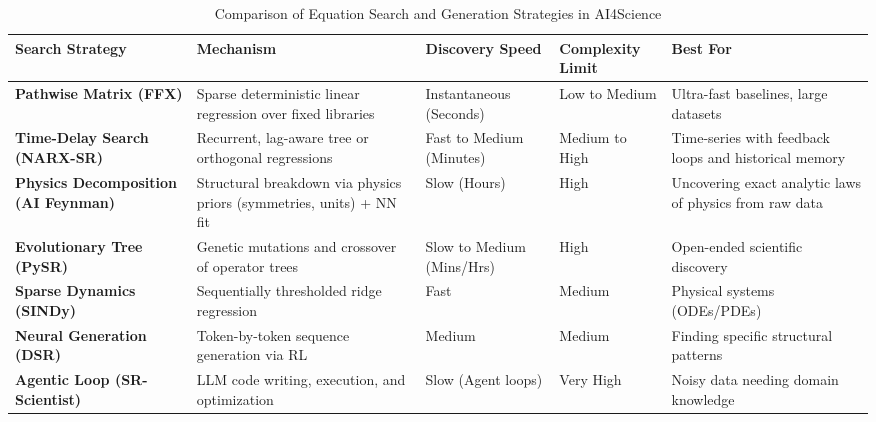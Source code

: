 \documentclass[11pt,a4paper]{article}
\begin{document}
\begin{table}[htbp]
\centering
\small %
\caption{Comparison of Equation Search and Generation Strategies in AI4Science}
\label{tab:equation_strategies}
\vspace{3mm} 
\begin{tabularx}{\textwidth}{Y{0.9} Y{1.4} Y{0.8} Y{0.8} Y{1.1}}
\toprule
\textbf{Search Strategy} & \textbf{Mechanism} & \textbf{Discovery Speed} & \textbf{Complexity Limit} & \textbf{Best For} \\ 
\midrule
\textbf{Pathwise Matrix (FFX)} & Sparse deterministic linear regression over fixed libraries & Instantaneous (Seconds) & Low to Medium & Ultra-fast baselines, large datasets \\
\addlinespace[0.8em]
\textbf{Time-Delay Search (NARX-SR)} & Recurrent, lag-aware tree or orthogonal regressions & Fast to Medium (Minutes) & Medium to High & Time-series with feedback loops and historical memory \\
\addlinespace[0.8em]
\textbf{Physics Decomposition (AI Feynman)} & Structural breakdown via physics priors (symmetries, units) + NN fit & Slow (Hours) & High & Uncovering exact analytic laws of physics from raw data \\
\addlinespace[0.8em]
\textbf{Evolutionary Tree (PySR)} & Genetic mutations and crossover of operator trees & Slow to Medium (Mins/Hrs) & High & Open-ended scientific discovery \\
\addlinespace[0.8em]
\textbf{Sparse Dynamics (SINDy)} & Sequentially thresholded ridge regression & Fast & Medium & Physical systems (ODEs/PDEs) \\
\addlinespace[0.8em]
\textbf{Neural Generation (DSR)} & Token-by-token sequence generation via RL & Medium & Medium & Finding specific structural patterns \\
\addlinespace[0.8em]
\textbf{Agentic Loop (SR-Scientist)} & LLM code writing, execution, and optimization & Slow (Agent loops) & Very High & Noisy data needing domain knowledge \\ 
\bottomrule
\end{tabularx}
\end{table}
\end{document}
